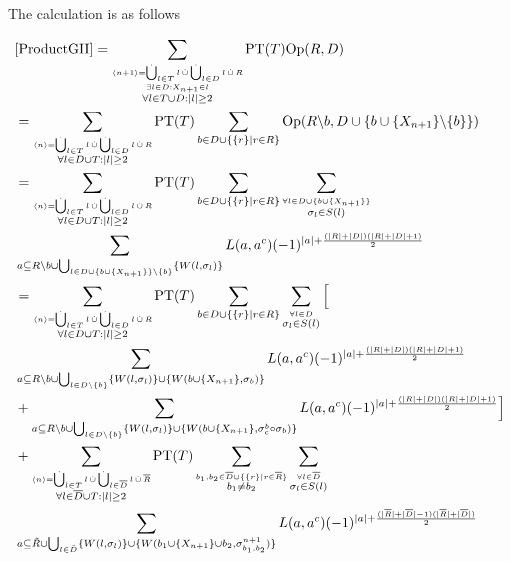 \documentclass[b5paper,draft,openbib,12pt]{memoir}
\DeclareMathOperator{\dotCup}{\mathop{\dot{\bigcup}}}
\DeclareMathOperator{\dotcup}{\mathop{\dot{\cup}}}
\begin{document}
The calculation is as follows

\begin{align}\notag
&\eqref{ProductGII}= \sum_{\stackrel{\langle n +1 \rangle = \dotCup_{l\in T} l \dotcup \dotCup_{l\in D} l \dotcup R}{\stackrel{\exists l\in D: X_{n+1}\in l}{ \forall l \in T \cup D: |l|\ge 2}}} \text{PT}(T) \text{Op}(R,D)\\\notag
&=\sum_{\stackrel{\langle n \rangle = \dotCup_{l\in T}l \dotcup \dotCup_{l\in D}l \dotcup R}{\forall l \in D\cup T: |l|\ge 2}} \text{PT}(T) \sum_{b\in D \cup \{\{r\}\mid r \in R\}} \text{Op} (R\backslash b , D\cup \{ b \cup \{X_{n+1}\}\backslash \{b\}\})\\\notag
&=\sum_{\stackrel{\langle n \rangle = \dotCup_{l\in T}l \dotcup \dotCup_{l\in D}l \dotcup R}{\forall l \in D\cup T: |l|\ge 2}} \text{PT}(T) \sum_{b\in D \cup \{\{r\}\mid r \in R\}} \sum_{\stackrel{\forall l \in D \cup \{b \cup \{X_{n+1}\}\}}{\sigma_l \in S(l)}}\\\notag
 &\sum_{a \subseteq R\backslash b \cup \bigcup_{l \in D \cup \{b \cup \{X_{n+1}\} \}\backslash \{b\}}\{W(l,\sigma_l)\}} L(a,a^c) (-1)^{|a|+ \frac{(|R|+|D|)(|R|+|D|+1)}{2}}\\\notag
&=\sum_{\stackrel{\langle n \rangle = \dotCup_{l\in T}l \dotcup \dotCup_{l\in D}l \dotcup R}{\forall l \in D\cup T: |l|\ge 2}} \text{PT}(T) \sum_{b\in D \cup \{\{r\}\mid r \in R\}} \sum_{\stackrel{\forall l \in D}{\sigma_l \in S(l)}}\Big[\\\label{ProductGII.1}
 &\sum_{a \subseteq R\backslash b \cup \bigcup_{l \in D\backslash \{b\}}\{W(l,\sigma_l)\} \cup \{W(b\cup \{X_{n+1}\},\sigma_b)\}} L(a,a^c) (-1)^{|a|+ \frac{(|R|+|D|)(|R|+|D|+1)}{2}}\\\label{ProductGII.2}
&+\sum_{a \subseteq R\backslash b \cup \bigcup_{l \in D\backslash \{b\}}\{W(l,\sigma_l)\}\cup \{W(b\cup \{X_{n+1}\},\sigma^b_c \circ\sigma_b)\}} L(a,a^c) (-1)^{|a|+ \frac{(|R|+|D|)(|R|+|D|+1)}{2}}\Big]\\\notag
&+\sum_{\stackrel{\langle n \rangle = \dotCup_{l\in T}l \dotcup \dotCup_{l\in \overline{D}}l \dotcup \overline{R}}{\forall l \in \overline{D}\cup T: |l|\ge 2}} \text{PT}(T) \sum_{\stackrel{b_1,b_2\in \overline{D} \cup \{\{r\}\mid r \in \overline{R}\}}{b_1 \neq b_2}} \sum_{\stackrel{\forall l \in \overline{D} }{\sigma_l \in S(l)}}\\\label{ProductGII.3}
&\sum_{a \subseteq \tilde{R}\cup \bigcup_{l \in \tilde{D}}\{W(l,\sigma_l)\} \cup \{W(b_1\cup \{X_{n+1}\}\cup b_2,\sigma^{n+1}_{b_1,b_2})\}} L(a,a^c) (-1)^{|a|+ \frac{(|\overline{R}|+|\overline{D}|-1)(|\overline{R}|+|\overline{D}|)}{2}}
\end{align}
\end{document}
